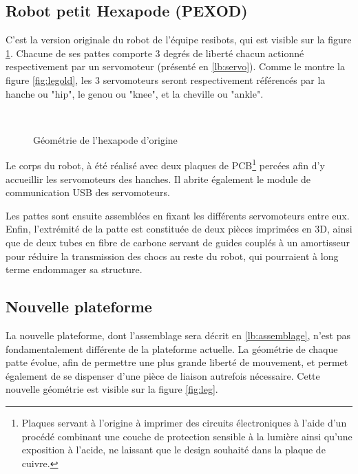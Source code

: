 \documentclass{tnreport}
\begin{document}
\subsection{Robot petit Hexapode (PEXOD)}
C'est la version originale du robot de l'équipe resibots, qui est visible sur la figure \ref{fig:pexod}. Chacune de ses pattes comporte 3 degrés de liberté chacun actionné respectivement par un \gls{servomoteur} (présenté en \ref{lb:servo}). Comme le montre la figure \ref{fig:legold}, les 3 \glspl{servomoteur} seront respectivement référencés par la hanche ou "hip", le genou ou "knee", et la cheville ou "ankle".

\begin{figure}[h]
\centering
{}\qquad
{}\\
\caption{Géométrie de l'hexapode d'origine}
\label{fig:pexod}
\end{figure}

Le corps du robot, à été réalisé avec deux plaques de \gls{PCB}\footnote{Plaques servant à l'origine à imprimer des circuits électroniques à l'aide d'un procédé combinant une couche de protection sensible à la lumière ainsi qu'une exposition à l'acide, ne laissant que le design souhaité dans la plaque de cuivre.} percées afin d'y accueillir les \glspl{servomoteur} des hanches. Il abrite également le module de communication \gls{USB} des \glspl{servomoteur}. 

Les pattes sont ensuite assemblées en fixant les différents servomoteurs entre eux. Enfin, l'extrémité de la patte est constituée de deux pièces imprimées en 3D, ainsi que de deux tubes en fibre de carbone servant de guides couplés à un amortisseur pour réduire la transmission des chocs au reste du robot, qui pourraient à long terme endommager sa structure. 

\subsection{Nouvelle plateforme}\label{lb:newRobot}
La nouvelle plateforme, dont l'assemblage sera décrit en \ref{lb:assemblage}, n'est pas fondamentalement différente de la plateforme actuelle. La géométrie de chaque patte évolue, afin de permettre une plus grande liberté de mouvement, et permet également de se dispenser d'une pièce de liaison autrefois nécessaire. Cette nouvelle géométrie est visible sur la figure \ref{fig:leg}. 
\end{document}
